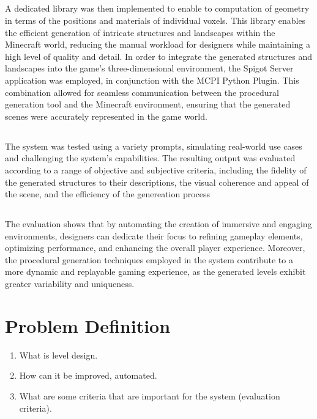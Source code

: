\documentclass{fict}
\begin{document}
\begin{flushleft}
    \subsection*{}
    A dedicated library was then implemented to enable to computation of geometry in terms of the positions and materials of individual voxels.
    This library enables the efficient generation of intricate structures and landscapes within the Minecraft world, reducing the manual workload for designers while maintaining a high level of quality and detail.
    In order to integrate the generated structures and landscapes into the game's three-dimensional environment, the Spigot Server application was employed, in conjunction with the MCPI Python Plugin. This combination allowed for seamless communication between the procedural generation tool and the Minecraft environment, ensuring that the generated scenes were accurately represented in the game world.


    \subsection*{}
    The system was tested using a variety prompts, simulating real-world use cases and challenging the system's capabilities. The resulting output was evaluated according to a range of objective and subjective criteria, including the fidelity of the generated structures to their descriptions, the visual coherence and appeal of the scene, and the efficiency of the genereation process

    \subsection*{}
    The evaluation shows that by automating the creation of immersive and engaging environments, designers can dedicate their focus to refining gameplay elements, optimizing performance, and enhancing the overall player experience. Moreover, the procedural generation techniques employed in the system contribute to a more dynamic and replayable gaming experience, as the generated levels exhibit greater variability and uniqueness.

    \pagebreak


\section*{Problem Definition}
\begin{enumerate}
    \item What is level design.
    \item How can it be improved, automated.
    \item What are some criteria that are important for the system (evaluation criteria).
\end{enumerate}


\end{flushleft}
\end{document}
